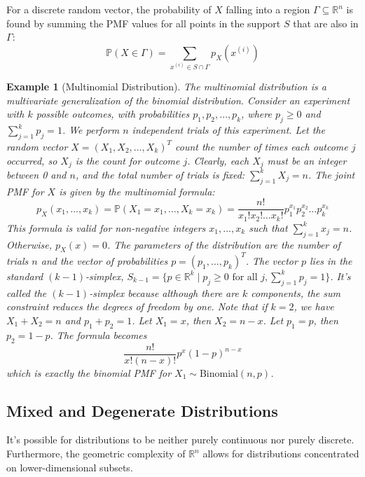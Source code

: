 \documentclass[11pt]{article}
\newtheorem{example}[theorem]{Example}
\theoremstyle{definition} %
\newcommand{\R}{\mathbb{R}} %
\renewcommand{\P}{\mathbb{P}} %
\begin{document}
For a discrete random vector, the probability of $X$ falling into a region $\Gamma \subseteq \R^n$ is found by summing the PMF values for all points in the support $S$ that are also in $\Gamma$:
\[ \P(X \in \Gamma) = \sum_{x^{(i)} \in S \cap \Gamma} p_X(x^{(i)}) \]

\begin{example}[Multinomial Distribution] \label{ex:multinomial}
The multinomial distribution is a multivariate generalization of the binomial distribution. Consider an experiment with $k$ possible outcomes, with probabilities $p_1, p_2, \dots, p_k$, where $p_j \ge 0$ and $\sum_{j=1}^k p_j = 1$. We perform $n$ independent trials of this experiment.
Let the random vector $X = (X_1, X_2, \dots, X_k)^T$ count the number of times each outcome $j$ occurred, so $X_j$ is the count for outcome $j$.
Clearly, each $X_j$ must be an integer between 0 and $n$, and the total number of trials is fixed: $\sum_{j=1}^k X_j = n$.
The joint PMF for $X$ is given by the multinomial formula:
\[ p_X(x_1, \dots, x_k) = \P(X_1 = x_1, \dots, X_k = x_k) = \frac{n!}{x_1! x_2! \dots x_k!} p_1^{x_1} p_2^{x_2} \dots p_k^{x_k} \]
This formula is valid for non-negative integers $x_1, \dots, x_k$ such that $\sum_{j=1}^k x_j = n$. Otherwise, $p_X(x) = 0$.
The parameters of the distribution are the number of trials $n$ and the vector of probabilities $p = (p_1, \dots, p_k)^T$. The vector $p$ lies in the standard $(k-1)$-simplex, $S_{k-1} = \{ p \in \R^k \mid p_j \ge 0 \text{ for all } j, \sum_{j=1}^k p_j = 1 \}$. It's called the $(k-1)$-simplex because although there are $k$ components, the sum constraint reduces the degrees of freedom by one.
Note that if $k=2$, we have $X_1 + X_2 = n$ and $p_1 + p_2 = 1$. Let $X_1 = x$, then $X_2 = n-x$. Let $p_1=p$, then $p_2=1-p$. The formula becomes
\[ \frac{n!}{x! (n-x)!} p^x (1-p)^{n-x} \]
which is exactly the binomial PMF for $X_1 \sim \text{Binomial}(n, p)$.
\end{example}

\subsection{Mixed and Degenerate Distributions}

It's possible for distributions to be neither purely continuous nor purely discrete. Furthermore, the geometric complexity of $\R^n$ allows for distributions concentrated on lower-dimensional subsets.
\end{document}
